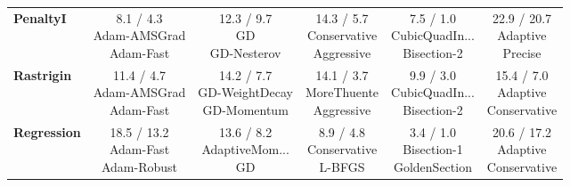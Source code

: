 \begin{longtable}{lccccc}
\textbf{PenaltyI} &  \makecell{8.1 / 4.3 \\ \scriptsize{Adam-AMSGrad} \\ \scriptsize{Adam-Fast}}&  \makecell{12.3 / 9.7 \\ \scriptsize{GD} \\ \scriptsize{GD-Nesterov}}&  \makecell{14.3 / 5.7 \\ \scriptsize{Conservative} \\ \scriptsize{Aggressive}}& \cellcolor{bestgreen!30} \makecell{7.5 / 1.0 \\ \scriptsize{CubicQuadIn...} \\ \scriptsize{Bisection-2}}& \cellcolor{worstred!20} \makecell{22.9 / 20.7 \\ \scriptsize{Adaptive} \\ \scriptsize{Precise}} \\
\textbf{Rastrigin} &  \makecell{11.4 / 4.7 \\ \scriptsize{Adam-AMSGrad} \\ \scriptsize{Adam-Fast}}&  \makecell{14.2 / 7.7 \\ \scriptsize{GD-WeightDecay} \\ \scriptsize{GD-Momentum}}&  \makecell{14.1 / 3.7 \\ \scriptsize{MoreThuente} \\ \scriptsize{Aggressive}}& \cellcolor{bestgreen!30} \makecell{9.9 / 3.0 \\ \scriptsize{CubicQuadIn...} \\ \scriptsize{Bisection-2}}& \cellcolor{worstred!20} \makecell{15.4 / 7.0 \\ \scriptsize{Adaptive} \\ \scriptsize{Conservative}} \\
\textbf{Regression} &  \makecell{18.5 / 13.2 \\ \scriptsize{Adam-Fast} \\ \scriptsize{Adam-Robust}}&  \makecell{13.6 / 8.2 \\ \scriptsize{AdaptiveMom...} \\ \scriptsize{GD}}&  \makecell{8.9 / 4.8 \\ \scriptsize{Conservative} \\ \scriptsize{L-BFGS}}& \cellcolor{bestgreen!30} \makecell{3.4 / 1.0 \\ \scriptsize{Bisection-1} \\ \scriptsize{GoldenSection}}& \cellcolor{worstred!20} \makecell{20.6 / 17.2 \\ \scriptsize{Adaptive} \\ \scriptsize{Conservative}} \\

\end{longtable}
